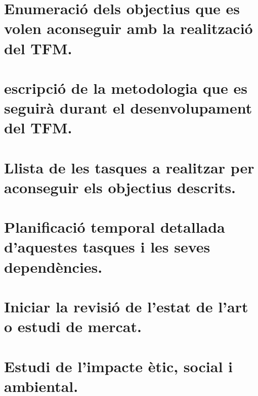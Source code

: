 \documentclass[a4paper, 12pt, left=1.5cm, right=1.5cm, top=1.5cm, bottom=1.5cm]{article}
\begin{document}
\section{Enumeració dels objectius que es volen aconseguir amb la realització del TFM.}
\section{escripció de la metodologia que es seguirà durant el desenvolupament del TFM.}
\section{Llista de les tasques a realitzar per aconseguir els objectius descrits.}
\section{Planificació temporal detallada d'aquestes tasques i les seves dependències.}
\section{Iniciar la revisió de l'estat de l'art o estudi de mercat.}
\section{Estudi de l'impacte ètic, social i ambiental.}
\end{document}
